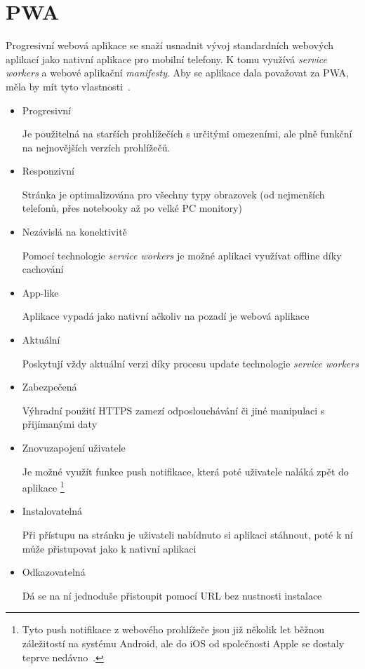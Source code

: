\section{PWA}

Progresivní webová aplikace se snaží usnadnit vývoj standardních webových aplikací jako nativní aplikace pro mobilní telefony.
K tomu využívá \emph{service workers} a webové aplikační \emph{manifesty}. Aby se aplikace dala považovat za PWA, měla by
mít tyto vlastnosti~\cite{PWAAckee}.


\begin{itemize}
    \item Progresivní

    Je použitelná na starších prohlížečích s určitými omezeními, ale plně funkční na nejnovějších verzích prohlížečů.
    \item Responzivní

    Stránka je optimalizována pro všechny typy obrazovek (od nejmenších telefonů, přes notebooky až po velké PC monitory)
    \item Nezávislá na konektivitě

    Pomocí technologie \emph{service workers} je možné aplikaci využívat offline díky cachování
    \item App-like

    Aplikace vypadá jako nativní ačkoliv na pozadí je webová aplikace
    \item Aktuální

    Poskytují vždy aktuální verzi díky procesu update technologie \emph{service workers}
    \item Zabezpečená

    Výhradní použití HTTPS zamezí odposlouchávání či jiné manipulaci s přijímanými daty
    \item Znovuzapojení uživatele

    Je možné využít funkce push notifikace, která poté uživatele naláká zpět do aplikace \footnote{Tyto push notifikace z webového prohlížeče jsou již několik let běžnou
    záležitostí na systému Android, ale do iOS od společnosti Apple se dostaly teprve nedávno~\cite{PWANotifications}.}
    \item Instalovatelná

    Při přístupu na stránku je uživateli nabídnuto si aplikaci stáhnout, poté k ní může přistupovat jako k nativní aplikaci
    \item Odkazovatelná

    Dá se na ní jednoduše přistoupit pomocí URL bez nustnosti instalace
\end{itemize}
